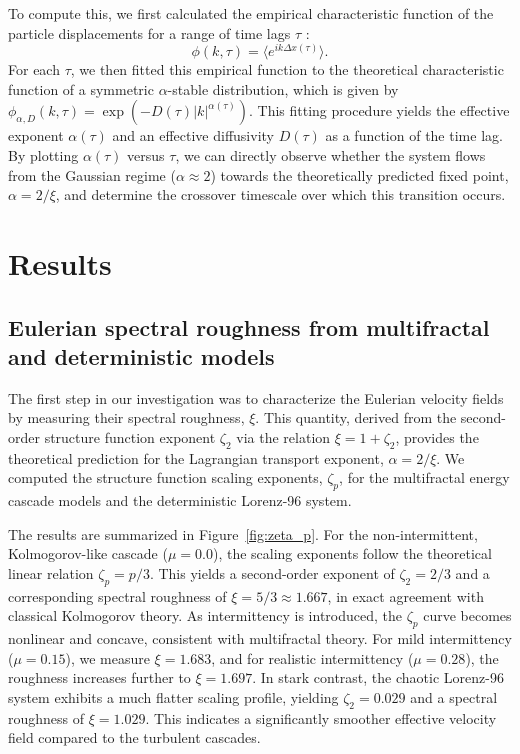 \documentclass[]{article}
\begin{document}
To compute this, we first calculated the empirical characteristic function of the particle displacements for a range of time lags $\tau$ \citep{kaiser2026limittheoremsempiricaldistribution}:
\begin{equation}\phi(k, \tau) = \langle e^{ik\Delta x(\tau)} \rangle.\end{equation}
For each $\tau$, we then fitted this empirical function to the theoretical characteristic function of a symmetric $\alpha$-stable distribution, which is given by $\phi_{\alpha, D}(k, \tau) = \exp(-D(\tau)|k|^{\alpha(\tau)})$. This fitting procedure yields the effective exponent $\alpha(\tau)$ and an effective diffusivity $D(\tau)$ as a function of the time lag. By plotting $\alpha(\tau)$ versus $\tau$, we can directly observe whether the system flows from the Gaussian regime ($\alpha \approx 2$) towards the theoretically predicted fixed point, $\alpha = 2/\xi$, and determine the crossover timescale over which this transition occurs.

\section{Results}
\label{sec:results}
\subsection{Eulerian spectral roughness from multifractal and deterministic models}

The first step in our investigation was to characterize the Eulerian velocity fields by measuring their spectral roughness, $\xi$. This quantity, derived from the second-order structure function exponent $\zeta_2$ via the relation $\xi = 1 + \zeta_2$, provides the theoretical prediction for the Lagrangian transport exponent, $\alpha = 2/\xi$. We computed the structure function scaling exponents, $\zeta_p$, for the multifractal energy cascade models and the deterministic Lorenz-96 system.

The results are summarized in Figure~\ref{fig:zeta_p}. For the non-intermittent, Kolmogorov-like cascade ($\mu=0.0$), the scaling exponents follow the theoretical linear relation $\zeta_p = p/3$. This yields a second-order exponent of $\zeta_2 = 2/3$ and a corresponding spectral roughness of $\xi = 5/3 \approx 1.667$, in exact agreement with classical Kolmogorov theory. As intermittency is introduced, the $\zeta_p$ curve becomes nonlinear and concave, consistent with multifractal theory. For mild intermittency ($\mu=0.15$), we measure $\xi = 1.683$, and for realistic intermittency ($\mu=0.28$), the roughness increases further to $\xi = 1.697$. In stark contrast, the chaotic Lorenz-96 system exhibits a much flatter scaling profile, yielding $\zeta_2 = 0.029$ and a spectral roughness of $\xi = 1.029$. This indicates a significantly smoother effective velocity field compared to the turbulent cascades.
\end{document}
